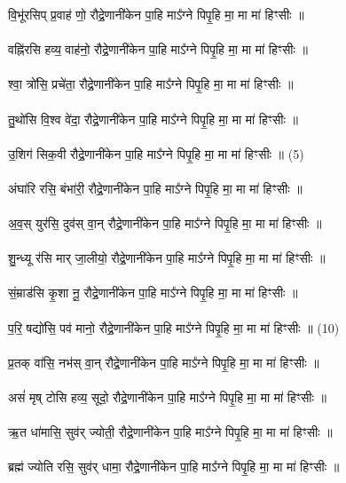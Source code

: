 \subsection{}
\\
वि॒भू॑रसिप् प्र॒वाह॑ णो॒ रौद्रे॒णानी॑केन पा॒हि माऽ᳚ग्ने पिपृ॒हि मा॒ मा मा॑ हिꣳसीः ॥\\
\\
वह्नि॑रसि हव्य॒ वाह॑नो॒ रौद्रे॒णानी॑केन पा॒हि माऽ᳚ग्ने पिपृ॒हि मा॒ मा मा॑ हिꣳसीः ॥\\
\\
श्वा॒ त्रो॑सि॒ प्रचे॑ता॒ रौद्रे॒णानी॑केन पा॒हि माऽ᳚ग्ने पिपृ॒हि मा॒ मा मा॑ हिꣳसीः ॥\\
\\
तु॒थो॑सि वि॒श्व वे॑दा॒ रौद्रे॒णानी॑केन पा॒हि माऽ᳚ग्ने पिपृ॒हि मा॒ मा मा॑ हिꣳसीः ॥\\
\\
उ॒शिग॑ सिक॒वी रौद्रे॒णानी॑केन पा॒हि माऽ᳚ग्ने पिपृ॒हि मा॒ मा मा॑ हिꣳसीः ॥  (5)\\
\\
अंघा॑रि रसि॒ बंभा॑री॒ रौद्रे॒णानी॑केन पा॒हि माऽ᳚ग्ने पिपृ॒हि मा॒ मा मा॑ हिꣳसीः ॥\\
\\
अ॒व॒स् युर॑सि॒ दुव॑स् वा॒न् रौद्रे॒णानी॑केन पा॒हि माऽ᳚ग्ने पिपृ॒हि मा॒ मा मा॑ हिꣳसीः ॥\\
\\
शु॒न्ध्यू र॑सि मार् जा॒लीयो॒ रौद्रे॒णानी॑केन पा॒हि माऽ᳚ग्ने पिपृ॒हि मा॒ मा मा॑ हिꣳसीः ॥\\
\\
सं॒म्राड॑सि कृ॒शा नू॒ रौद्रे॒णानी॑केन पा॒हि माऽ᳚ग्ने पिपृ॒हि मा॒ मा मा॑ हिꣳसीः ॥\\
\\
प॒रि॒ षद्यो॑सि॒ पव॑ मानो॒ रौद्रे॒णानी॑केन पा॒हि माऽ᳚ग्ने पिपृ॒हि मा॒ मा मा॑ हिꣳसीः ॥ (10)\\
\\
प्र॒तक् वा॑सि॒ नभ॑स् वा॒न् रौद्रे॒णानी॑केन पा॒हि माऽ᳚ग्ने पिपृ॒हि मा॒ मा मा॑ हिꣳसीः ॥\\
\\
असं॑ मृष् टोसि हव्य॒ सूदो॒ रौद्रे॒णानी॑केन पा॒हि माऽ᳚ग्ने पिपृ॒हि मा॒ मा मा॑ हिꣳसीः ॥\\
\\
ऋ॒त धा॑मासि॒ सुव॑र् ज्योती॒ रौद्रे॒णानी॑केन पा॒हि माऽ᳚ग्ने पिपृ॒हि मा॒ मा मा॑ हिꣳसीः ॥\\
\\
ब्रह्म॑ ज्योति रसि॒ सुव॑र् धामा॒ रौद्रे॒णानी॑केन पा॒हि माऽ᳚ग्ने पिपृ॒हि मा॒ मा मा॑ हिꣳसीः ॥\\
\\
